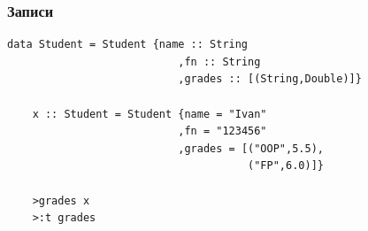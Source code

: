 \documentclass{beamer}
\begin{document}
\begin{frame}[fragile]
  \frametitle{Записи}

  \begin{lstlisting}[basicstyle=\small]
    data Student = Student {name :: String
                           ,fn :: String
                           ,grades :: [(String,Double)]}

    x :: Student = Student {name = "Ivan"
                           ,fn = "123456"
                           ,grades = [("OOP",5.5),
                                      ("FP",6.0)]}                           

    >grades x
    >:t grades
  \end{lstlisting}

\end{frame}


\end{document}
